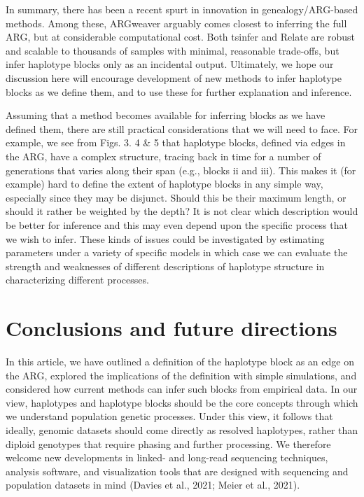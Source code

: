 \documentclass[twocolumn]{bmcart}%
\begin{document}
In summary, there has been a recent spurt in innovation in genealogy/ARG-based methods. Among these, ARGweaver arguably comes closest to inferring the full ARG, but at considerable computational cost. Both tsinfer and Relate are robust and scalable to thousands of samples with minimal, reasonable trade-offs, but infer haplotype blocks only as an incidental output. Ultimately, we hope our discussion here will encourage development of new methods to infer haplotype blocks as we define them, and to use these for further explanation and inference. 

Assuming that a method becomes available for inferring blocks as we have defined them, there are still practical considerations that we will need to face. For example, we see from Figs. 3. 4 \& 5 that haplotype blocks, defined via edges in the ARG, have a complex structure, tracing back in time for a number of generations that varies along their span (e.g., blocks ii and iii). This makes it (for example) hard to define the extent of haplotype blocks in any simple way, especially since they may be disjunct. Should this be their maximum length, or should it rather be weighted by the depth? It is not clear which description would be better for inference and this may even depend upon the specific process that we wish to infer. These kinds of issues could be investigated by estimating parameters under a variety of specific models in which case we can evaluate the strength and weaknesses of different descriptions of haplotype structure in characterizing different processes.

\section*{Conclusions and future directions}
In this article, we have outlined a definition of the haplotype block as an edge on the ARG, explored the implications of the definition with simple simulations, and considered how current methods can infer such blocks from empirical data. In our view, haplotypes and haplotype blocks should be the core concepts through which we understand population genetic processes. Under this view, it follows that ideally, genomic datasets should come directly as resolved haplotypes, rather than diploid genotypes that require phasing and further processing. We therefore welcome new developments in linked- and long-read sequencing techniques, analysis software, and visualization tools that are designed with sequencing and population datasets in mind (Davies et al., 2021; Meier et al., 2021).
\end{document}
